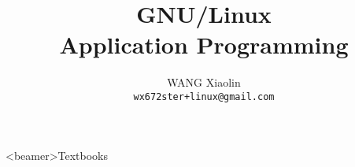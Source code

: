 \newcommand{\unix}{{\fontspec{Purisa}{UNIX}}}
\newcommand{\emacs}{\texttt{[image: emacs]}}
\newcommand{\google}{\raisebox{-.2em}{\texttt{[image: google]}}}
\newcommand{\GG}{\textcolor{SkyBlue}{\nerd }}
\newcommand{\world}{\textcolor{SkyBlue}{\nerd }}
\newcommand{\pdf}{\textcolor{red}{\nerd }}%
\newcommand{\folder}{{\nerd }}%
\newcommand{\git}{{\nerd }}%
\newcommand{\moodle}{\texttt{[image: moodle]}}
\newcommand{\obook}{{\nerd }}%
\newcommand{\shell}{{\nerd }}%
\newcommand{\CMD}[1]{\texttt{\textcolor{Green}{\$} #1}}
\newcommand{\cmd}[1]{\texttt{#1}}
\newcommand{\vim}{{\nerd }}
\newcommand{\stackoverflow}{{\nerd }}%
\newcommand{\correct}{{\Large\textcolor{Green}{\nerd ✔}}}
\newcommand{\wrong}{\textcolor{red}{\nerd ✘}}
\newcommand{\Bad}{{\Large \textcolor{red}{\bad}}}
\newcommand{\Good}{{\Large \textcolor{Green}{\good}}}






\title{GNU/Linux\\Application Programming}
\author{WANG Xiaolin\\%
  {\footnotesize\texttt{wx672ster+linux@gmail.com}}}





\begin{frame}<beamer>{Textbooks}
  \begin{refsection}
    \nocite{matthew2008beginning, cooper10bash, raymond2003art, stevens2013advanced,
      Love:2007:LSP:1205435, Kerrisk:2010:LPI:1869911, Bryant2010computersystems}%
    \printbibliography[heading=none]
  \end{refsection}
\end{frame}

